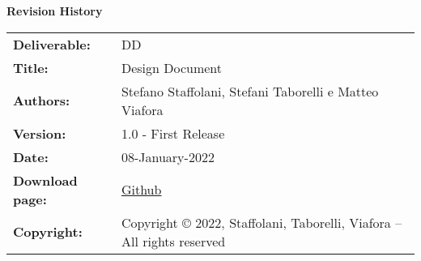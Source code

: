 \textbf{Revision History}
\begin{table}[h!]
\begin{tabu} to \textwidth { X[0.3,r,p] X[0.7,l,p] }
\hline

\textbf{Deliverable:} & DD\\
\textbf{Title:} & Design Document \\
\textbf{Authors:} & Stefano Staffolani, Stefani Taborelli e Matteo Viafora \\
\textbf{Version:} & 1.0 - First Release \\ 
\textbf{Date:} & 08-January-2022 \\
\textbf{Download page:} & \href{https://github.com/ViaforaMatteo/StaffolaniTaborelliViafora}{Github} \\
\textbf{Copyright:} & Copyright © 2022, Staffolani, Taborelli, Viafora – All rights reserved \\
\hline
\end{tabu}
\end{table}